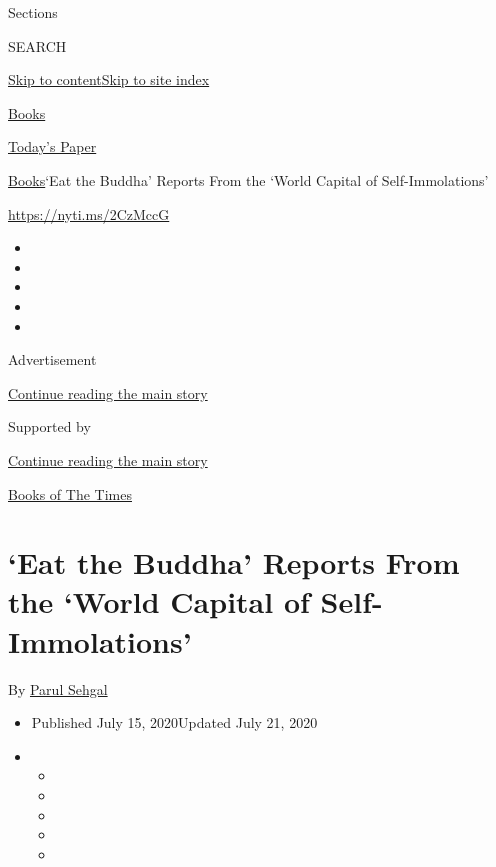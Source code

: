 Sections

SEARCH

\protect\hyperlink{site-content}{Skip to
content}\protect\hyperlink{site-index}{Skip to site index}

\href{https://www.nytimes3xbfgragh.onion/section/books}{Books}

\href{https://myaccount.nytimes3xbfgragh.onion/auth/login?response_type=cookie\&client_id=vi}{}

\href{https://www.nytimes3xbfgragh.onion/section/todayspaper}{Today's
Paper}

\href{/section/books}{Books}\textbar{}`Eat the Buddha' Reports From the
`World Capital of Self-Immolations'

\url{https://nyti.ms/2CzMccG}

\begin{itemize}
\item
\item
\item
\item
\item
\end{itemize}

Advertisement

\protect\hyperlink{after-top}{Continue reading the main story}

Supported by

\protect\hyperlink{after-sponsor}{Continue reading the main story}

\href{/column/books-of-the-times}{Books of The Times}

\hypertarget{eat-the-buddha-reports-from-the-world-capital-of-self-immolations}{%
\section{`Eat the Buddha' Reports From the `World Capital of
Self-Immolations'}\label{eat-the-buddha-reports-from-the-world-capital-of-self-immolations}}

By \href{https://www.nytimes3xbfgragh.onion/by/parul-sehgal}{Parul
Sehgal}

\begin{itemize}
\item
  Published July 15, 2020Updated July 21, 2020
\item
  \begin{itemize}
  \item
  \item
  \item
  \item
  \item
  \end{itemize}
\end{itemize}

